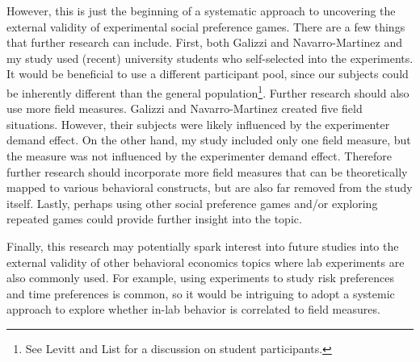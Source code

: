 \documentclass[12pt]{article}
\begin{document}
However, this is just the beginning of a systematic approach to uncovering the external validity of experimental social preference games. There are a few things that further research can include. First, both Galizzi and Navarro-Martinez and my study used (recent) university students who self-selected into the experiments. It would be beneficial to use a different participant pool, since our subjects could be inherently different than the general population\footnote{See Levitt and List for a discussion on student participants.}. Further research should also use more field measures. Galizzi and Navarro-Martinez created five field situations. However, their subjects were likely influenced by the experimenter demand effect. On the other hand, my study included only one field measure, but the measure was not influenced by the experimenter demand effect. Therefore further research should incorporate more field measures that can be theoretically mapped to various behavioral constructs, but are also far removed from the study itself. Lastly, perhaps using other social preference games and/or exploring repeated games could provide further insight into the topic.

Finally, this research may potentially spark interest into future studies into the external validity of other behavioral economics topics where lab experiments are also commonly used. For example, using experiments to study risk preferences and time preferences is common, so it would be intriguing to adopt a systemic approach to explore whether in-lab behavior is correlated to field measures.





\newpage
\onehalfspacing



%
\end{document}
